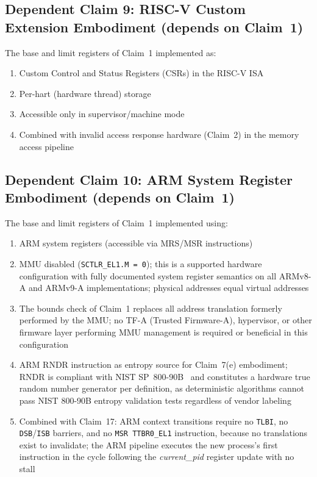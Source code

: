 \documentclass[12pt,letterpaper]{article}
\begin{document}
\medskip

\subsection*{Dependent Claim 9: RISC-V Custom Extension Embodiment
  (depends on Claim~1)}

The base and limit registers of Claim~1 implemented as:
\begin{enumerate}[label=(\alph*),noitemsep]
  \item Custom Control and Status Registers (CSRs) in the RISC-V ISA
  \item Per-hart (hardware thread) storage
  \item Accessible only in supervisor/machine mode
  \item Combined with invalid access response hardware (Claim~2) in
        the memory access pipeline
\end{enumerate}

\medskip

\subsection*{Dependent Claim 10: ARM System Register Embodiment
  (depends on Claim~1)}

The base and limit registers of Claim~1 implemented using:
\begin{enumerate}[label=(\alph*),noitemsep]
  \item ARM system registers (accessible via MRS/MSR instructions)
  \item MMU disabled (\texttt{SCTLR\_EL1.M = 0}); this is a
        supported hardware configuration with fully documented
        system register semantics on all ARMv8-A and ARMv9-A
        implementations; physical addresses equal virtual addresses
  \item The bounds check of Claim~1 replaces all address translation
        formerly performed by the MMU; no TF-A (Trusted Firmware-A),
        hypervisor, or other firmware layer performing MMU management
        is required or beneficial in this configuration
  \item ARM RNDR instruction as entropy source for Claim~7(e)
        embodiment; RNDR is compliant with NIST SP~800-90B~\cite{nist_90b}
        and constitutes a hardware true random number generator per
        definition, as deterministic algorithms cannot pass NIST
        800-90B entropy validation tests regardless of vendor
        labeling~\cite{arm_rndr}
  \item Combined with Claim~17: ARM context transitions require no
        \texttt{TLBI}, no \texttt{DSB}/\texttt{ISB} barriers, and
        no \texttt{MSR TTBR0\_EL1} instruction, because no
        translations exist to invalidate; the ARM pipeline
        executes the new process's first instruction in the
        cycle following the \textit{current\_pid} register update
        with no stall
\end{enumerate}
\end{document}

